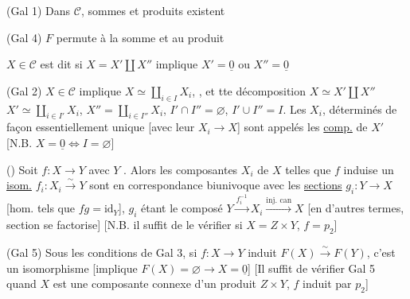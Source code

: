 (Gal 1) Dans $\mathcal C$,  sommes et  produits   existent


(Gal 4) $F$ permute à la somme et au produit


$X\in\mathcal C$ est dit   si $X=X'\amalg X''$ implique $X'=\underline{0}$
ou $X''=\underline{0}$

(Gal 2) $X\in\mathcal C$  implique $X\simeq\coprod_{i\in I}X_i$, , et tte décomposition
$X\simeq X'\amalg X''$  $X'\simeq\coprod_{i\in I'}X_i$, $X''=\coprod_{i\in I''}X_i$,
$I'\cap I''=\varnothing$, $I'\cup I''=I$. Les $X_i$, déterminés de
façon essentiellement unique [avec leur $X_i\to X$]
sont appelés les \uline{comp.}   de $X'$ [N.B. $X=\underline{0}\Leftrightarrow I=\varnothing$]

() Soit $f:X\to Y$ avec $Y$  . Alors les
composantes  $X_i$ de $X$ telles que $f$ induise
un \uline{isom.} $f_i:X_i\xrightarrow{\sim}Y$ sont en correspondance
biunivoque avec les \uline{sections} $g_i:Y\to X$ 
[hom. tels que $fg=\mathrm{id}_Y$], $g_i$ étant le composé
 $Y\xrightarrow{f_i^{-1}}X_i\xrightarrow{\text{inj. can}}X$ [en d'autres termes,
 section se factorise] [N.B. il suffit
de le vérifier si $X=Z\times Y$, $f=p_2$]

(Gal 5) Sous les conditions de Gal 3, si   $f:X\to Y$
induit $F(X)\xrightarrow{\sim}F(Y)$, c'est un isomorphisme
[implique $F(X)=\varnothing\to X=\underline{0}$] [Il suffit
de vérifier Gal 5 quand $X$ est une composante
connexe d'un produit $Z\times Y$, $f$ induit par $p_2$]

